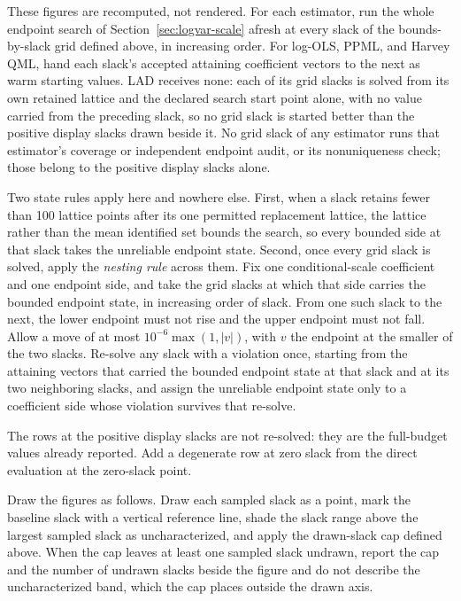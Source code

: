\documentclass[11pt]{article}
\begin{document}
\begin{enumerate}
These figures are recomputed, not rendered. For each estimator, run the whole endpoint search of Section~\ref{sec:logvar-scale} afresh at every
slack of the bounds-by-slack grid defined above, in increasing order. For log-OLS, PPML, and Harvey
QML, hand each slack's accepted attaining coefficient vectors to the next as warm starting values.
LAD receives none: each of its grid slacks is solved from its own retained lattice and the declared
search start point alone, with no value carried from the preceding slack, so no grid slack is
started better than the positive display slacks drawn beside it. No grid slack of any estimator
runs that estimator's coverage or independent endpoint audit, or its nonuniqueness check; those belong to the
positive display slacks alone.

Two state rules apply here and nowhere else. First, when a slack retains fewer than 100 lattice points after its one
permitted replacement lattice, the lattice rather than the mean identified set bounds the
search, so every bounded side at that slack takes the unreliable endpoint state. Second, once every
grid slack is solved, apply the \emph{nesting rule} across them. Fix one conditional-scale
coefficient and one endpoint side, and take the grid slacks at which that side carries the bounded
endpoint state, in increasing order of slack. From one such slack to the next, the lower endpoint
must not rise and the upper endpoint must not fall. Allow a move of at most
\(10^{-6}\max(1,|v|)\), with \(v\) the endpoint at the smaller of the two slacks. Re-solve any slack
with a violation once, starting from the attaining vectors that carried the bounded endpoint state at
that slack and at its two neighboring slacks, and assign the unreliable endpoint state only to a
coefficient side whose violation survives that re-solve.

The rows at the positive display slacks are
not re-solved: they are the full-budget values already reported. Add a degenerate row at zero slack
from the direct evaluation at the zero-slack point.

Draw the figures as follows. Draw each sampled slack as a point, mark the
baseline slack with a vertical reference line, shade the slack range above the largest sampled slack
as uncharacterized, and apply the drawn-slack cap defined above. When the cap leaves at least one
sampled slack undrawn, report the cap and the number of undrawn slacks beside the figure and do not
describe the uncharacterized band, which the cap places outside the drawn axis.


\end{enumerate}
\end{document}
